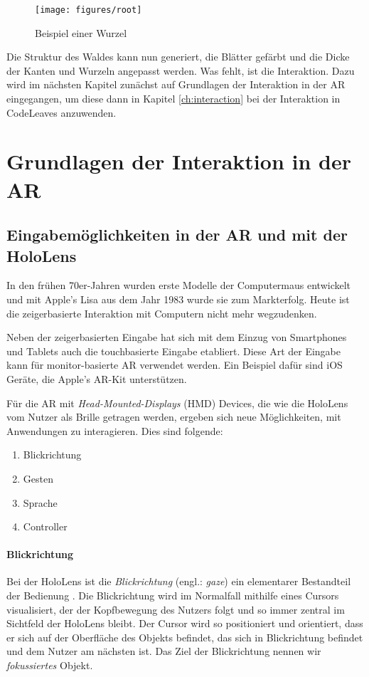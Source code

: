 \begin{figure}[htb]
  \texttt{[image: figures/root]}
  \caption{Beispiel einer Wurzel}
  \label{fig:root}
\end{figure}

Die Struktur des Waldes kann nun generiert, die Blätter gefärbt und die Dicke der Kanten und Wurzeln angepasst werden. Was fehlt, ist die Interaktion. Dazu wird im nächsten Kapitel zunächst auf Grundlagen der Interaktion in der AR eingegangen, um diese dann in Kapitel \ref{ch:interaction} bei der Interaktion in CodeLeaves anzuwenden.

\chapter{Grundlagen der Interaktion in der AR}
\label{ch:interaction-ar}

\section{Eingabemöglichkeiten in der AR und mit der HoloLens}
\label{sec:interaction-hololens}

In den frühen 70er-Jahren wurden erste Modelle der Computermaus entwickelt und mit Apple's Lisa aus dem Jahr 1983 wurde sie zum Markterfolg. Heute ist die zeigerbasierte Interaktion mit Computern nicht mehr wegzudenken.

Neben der zeigerbasierten Eingabe hat sich mit dem Einzug von Smartphones und Tablets auch die touchbasierte Eingabe etabliert. Diese Art der Eingabe kann für monitor-basierte AR verwendet werden. Ein Beispiel dafür sind iOS Geräte, die Apple's AR-Kit unterstützen.

Für die AR mit \textit{Head-Mounted-Displays} (HMD) Devices, die wie die HoloLens vom Nutzer als Brille getragen werden, ergeben sich neue Möglichkeiten, mit Anwendungen zu interagieren. Dies sind folgende:

\begin{enumerate}
  \item Blickrichtung
  \item Gesten
  \item Sprache
  \item Controller
\end{enumerate}

\subsubsection*{Blickrichtung}
Bei der HoloLens ist die \textit{Blickrichtung} (engl.: \textit{gaze}) ein elementarer Bestandteil der Bedienung \cite{windows2017interaction}. Die Blickrichtung wird im Normalfall mithilfe eines Cursors visualisiert, der der Kopfbewegung des Nutzers folgt und so immer zentral im Sichtfeld der HoloLens bleibt. Der Cursor wird so positioniert und orientiert, dass er sich auf der Oberfläche des Objekts befindet, das sich in Blickrichtung befindet und dem Nutzer am nächsten ist. Das Ziel der Blickrichtung nennen wir \textit{fokussiertes} Objekt.

